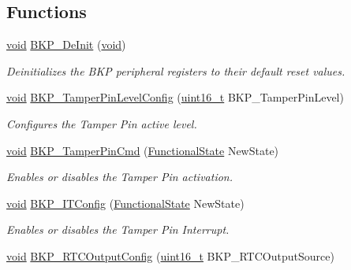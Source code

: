 \subsection*{Functions}
\begin{DoxyCompactItemize}
\item 
\hyperlink{usb__devapi_8h_afabf60e7f57651d6d595a02c75f07cd0}{void} \hyperlink{group___b_k_p___private___functions_gaabff4d8f5ebf4fd9a840bcc9042ca226}{B\+K\+P\+\_\+\+De\+Init} (\hyperlink{usb__devapi_8h_afabf60e7f57651d6d595a02c75f07cd0}{void})
\begin{DoxyCompactList}\small\item\em Deinitializes the B\+KP peripheral registers to their default reset values. \end{DoxyCompactList}\item 
\hyperlink{usb__devapi_8h_afabf60e7f57651d6d595a02c75f07cd0}{void} \hyperlink{group___b_k_p___private___functions_gae216446d641d075fb575ce6dbe2ff4c1}{B\+K\+P\+\_\+\+Tamper\+Pin\+Level\+Config} (\hyperlink{_p_e___types_8h_a1f1825b69244eb3ad2c7165ddc99c956}{uint16\+\_\+t} B\+K\+P\+\_\+\+Tamper\+Pin\+Level)
\begin{DoxyCompactList}\small\item\em Configures the Tamper Pin active level. \end{DoxyCompactList}\item 
\hyperlink{usb__devapi_8h_afabf60e7f57651d6d595a02c75f07cd0}{void} \hyperlink{group___b_k_p___private___functions_ga3a0cdff9ad8238ade2c67e2b70f530ac}{B\+K\+P\+\_\+\+Tamper\+Pin\+Cmd} (\hyperlink{agilefox_2library_2inc_2stm32f10x__type_8h_ac9a7e9a35d2513ec15c3b537aaa4fba1}{Functional\+State} New\+State)
\begin{DoxyCompactList}\small\item\em Enables or disables the Tamper Pin activation. \end{DoxyCompactList}\item 
\hyperlink{usb__devapi_8h_afabf60e7f57651d6d595a02c75f07cd0}{void} \hyperlink{group___b_k_p___private___functions_gab8dbd0c4773f6edb98a28c8ff6a2ead0}{B\+K\+P\+\_\+\+I\+T\+Config} (\hyperlink{agilefox_2library_2inc_2stm32f10x__type_8h_ac9a7e9a35d2513ec15c3b537aaa4fba1}{Functional\+State} New\+State)
\begin{DoxyCompactList}\small\item\em Enables or disables the Tamper Pin Interrupt. \end{DoxyCompactList}\item 
\hyperlink{usb__devapi_8h_afabf60e7f57651d6d595a02c75f07cd0}{void} \hyperlink{group___b_k_p___private___functions_ga3d1b22b3c6a79f7b423616a0af1885bf}{B\+K\+P\+\_\+\+R\+T\+C\+Output\+Config} (\hyperlink{_p_e___types_8h_a1f1825b69244eb3ad2c7165ddc99c956}{uint16\+\_\+t} B\+K\+P\+\_\+\+R\+T\+C\+Output\+Source)

\end{DoxyCompactItemize}
